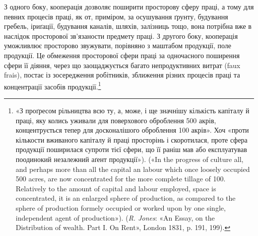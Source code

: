 З одного боку, кооперація дозволяє поширити просторову
сферу праці, а тому для певних процесів праці, як от, приміром,
за осушування ґрунту, будування гребель, іриґації, будування
каналів, шляхів, залізниць тощо, вона потрібна вже в наслідок
просторової зв’язаности предмету праці. З другого боку, кооперація
уможливлює просторово звужувати, порівняно з маштабом
продукції, поле продукції. Це обмеження просторової сфери праці
за одночасного поширення сфери її діяння, через що заощаджується
багато непродуктивних витрат (faux frais), постає із зосередження
робітників, зближення різних процесів праці та концентрації
засобів продукції.\footnote{
«З проґресом рільництва всю ту, а, може, і ще значнішу кількість
капіталу й праці, яку колись уживали для поверхового оброблення 500 акрів,
концентрується тепер для досконалішого оброблення 100 акрів».
Хоч «проти кількости вживаного капіталу й праці просторінь і скоротилася,
проте сфера продукції поширилася супроти тієї сфери, що її
раніш мав або експлуатував поодинокий незалежний аґент продукції»).
(«In the progress of culture all, and perhaps more than all the capital an
labour which once loosely occupied 500 acres, are now concentrated for the
more complete tillage of 100. Relatively to the amount of capital and labour
employed, space is concentrated, it is an enlarged sphere of production,
as compared to the sphere of production formely occupied or worked upon
by one single, independent agent of production»). (\emph{R. Jones}: «An Essay,
on the Distribution of wealth. Part I. On Rent», London 1831, p. 191,
199).
}

